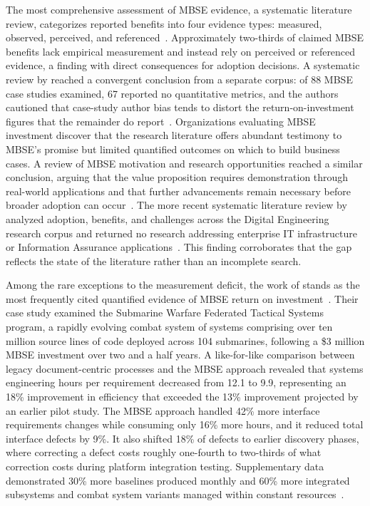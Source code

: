 The most comprehensive assessment of MBSE evidence, a systematic literature review, categorizes reported benefits into four evidence types: measured, observed, perceived, and referenced~\parencite{Henderson_Salado_2021}. Approximately two-thirds of claimed MBSE benefits lack empirical measurement and instead rely on perceived or referenced evidence, a finding with direct consequences for adoption decisions. A systematic review by \citeauthor{Carroll_Malins_2016} reached a convergent conclusion from a separate corpus: of 88 MBSE case studies examined, 67 reported no quantitative metrics, and the authors cautioned that case-study author bias tends to distort the return-on-investment figures that the remainder do report~\parencite{Carroll_Malins_2016}. Organizations evaluating MBSE investment discover that the research literature offers abundant testimony to MBSE's promise but limited quantified outcomes on which to build business cases. A review of MBSE motivation and research opportunities reached a similar conclusion, arguing that the value proposition requires demonstration through real-world applications and that further advancements remain necessary before broader adoption can occur~\parencite{Madni_Sievers_2018}. The more recent systematic literature review by \citeauthor{Wooley_Womack_2025} analyzed adoption, benefits, and challenges across the Digital Engineering research corpus and returned no research addressing enterprise IT infrastructure or Information Assurance applications~\parencite{Wooley_Womack_2025}. This finding corroborates that the gap reflects the state of the literature rather than an incomplete search.

Among the rare exceptions to the measurement deficit, the work of \citeauthor{Rogers_Mitchell_2021} stands as the most frequently cited quantified evidence of MBSE return on investment~\parencite{Rogers_Mitchell_2021}. Their case study examined the Submarine Warfare Federated Tactical Systems program, a rapidly evolving combat system of systems comprising over ten million source lines of code deployed across 104 submarines, following a \$3 million MBSE investment over two and a half years. A like-for-like comparison between legacy document-centric processes and the MBSE approach revealed that systems engineering hours per requirement decreased from 12.1 to 9.9, representing an 18\% improvement in efficiency that exceeded the 13\% improvement projected by an earlier pilot study. The MBSE approach handled 42\% more interface requirements changes while consuming only 16\% more hours, and it reduced total interface defects by 9\%. It also shifted 18\% of defects to earlier discovery phases, where correcting a defect costs roughly one-fourth to two-thirds of what correction costs during platform integration testing. Supplementary data demonstrated 30\% more baselines produced monthly and 60\% more integrated subsystems and combat system variants managed within constant resources~\parencite{Rogers_Mitchell_2021}.

